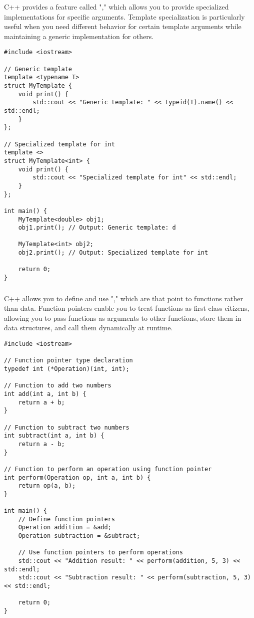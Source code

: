 C++ provides a feature called "," which allows you to provide specialized implementations for specific  arguments. Template specialization is particularly useful when you need different behavior for certain template arguments while maintaining a generic implementation for others.
\begin{lstlisting}
#include <iostream>

// Generic template
template <typename T>
struct MyTemplate {
    void print() {
        std::cout << "Generic template: " << typeid(T).name() << std::endl;
    }
};

// Specialized template for int
template <>
struct MyTemplate<int> {
    void print() {
        std::cout << "Specialized template for int" << std::endl;
    }
};

int main() {
    MyTemplate<double> obj1;
    obj1.print(); // Output: Generic template: d

    MyTemplate<int> obj2;
    obj2.print(); // Output: Specialized template for int

    return 0;
}
\end{lstlisting}






\subsubsection{}

C++ allows you to define and use "," which are  that point to functions rather than data. Function pointers enable you to treat functions as first-class citizens, allowing you to pass functions as arguments to other functions, store them in data structures, and call them dynamically at runtime.
\begin{lstlisting}
#include <iostream>

// Function pointer type declaration
typedef int (*Operation)(int, int);

// Function to add two numbers
int add(int a, int b) {
    return a + b;
}

// Function to subtract two numbers
int subtract(int a, int b) {
    return a - b;
}

// Function to perform an operation using function pointer
int perform(Operation op, int a, int b) {
    return op(a, b);
}

int main() {
    // Define function pointers
    Operation addition = &add;
    Operation subtraction = &subtract;

    // Use function pointers to perform operations
    std::cout << "Addition result: " << perform(addition, 5, 3) << std::endl;
    std::cout << "Subtraction result: " << perform(subtraction, 5, 3) << std::endl;

    return 0;
}
\end{lstlisting}

